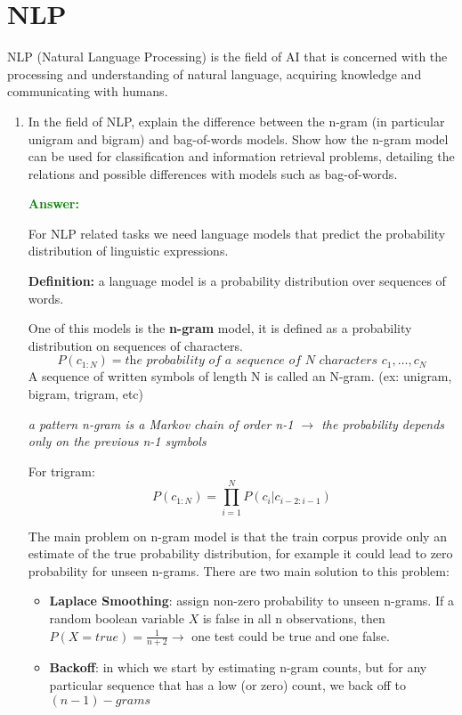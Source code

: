 \documentclass[12pt]{article}
\begin{document}
\section{NLP}
NLP (Natural Language Processing) is the field of AI that is concerned with the processing and understanding of natural language, acquiring knowledge and
communicating with humans.
\begin{enumerate}[label=\textbf{NLP.\arabic*}]

    \item In the field of NLP, explain the difference between the n-gram (in particular unigram and bigram) 
    and bag-of-words models.
    Show how the n-gram model can be used for classification and information retrieval problems, 
    detailing the relations and possible differences with models such as bag-of-words.

    \textcolor{green}{\textbf{Answer:}}

    For NLP related tasks we need language models that predict the probability distribution of linguistic expressions.

    \textbf{Definition:} a language model is a probability distribution over sequences of words.

    One of this models is the \textbf{n-gram} model, it is defined as a probability distribution on sequences of characters.
    \begin{equation}
        P(c_{1:N}) = \textit{the probability of a sequence of N characters } c_1,\ldots,c_N
    \end{equation}
    A sequence of written symbols of length N is called an N-gram. (ex: unigram, bigram, trigram, etc)
    \begin{center}
        \textit{a pattern n-gram is a Markov chain of order n-1 $\rightarrow$ the probability depends only on the previous n-1 symbols} 
    \end{center}
    For trigram:
    \begin{equation}
        P(c_{1:N}) = \prod_{i=1}^{N}P(c_i|c_{i-2:i-1})
    \end{equation}

    The main problem on n-gram model is that the train corpus provide only an estimate of the true probability distribution,
    for example it could lead to zero probability for unseen n-grams.
    There are two main solution to this problem:
    \begin{itemize}
        \item \textbf{Laplace Smoothing}: assign non-zero probability to unseen n-grams.
        If a random boolean variable $X$ is false in all n observations, then $P(X = true) = \frac{1}{n+2} \rightarrow$ one test could be true and one false.
        \item \textbf{Backoff}: in which we start by estimating n-gram counts, 
        but for any particular sequence that has a low (or zero) count, we back off to $(n-1)-grams$
    \end{itemize}


\end{enumerate}
\end{document}
